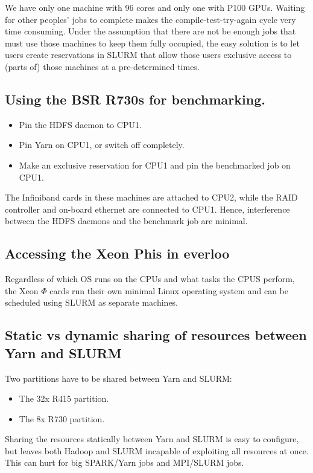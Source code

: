 \documentclass{article}
\begin{document}
We have only one machine with 96 cores and only one with P100 GPUs.
Waiting for other peoples' jobs to complete makes the compile-test-try-again
cycle very time consuming. Under the assumption that there are not be enough
jobs that must use those machines to keep them fully occupied, the easy solution
is to let users create reservations in SLURM that allow those users exclusive
access to (parts of) those machines at a pre-determined times.


\subsection{Using the BSR R730s for benchmarking.}

\begin{itemize}
\item Pin the HDFS daemon to CPU1.
\item Pin Yarn on CPU1, or switch off completely.
\item Make an exclusive reservation for CPU1 and pin the benchmarked job
on CPU1.
\end{itemize}

The Infiniband cards in these machines are attached to CPU2, while the
RAID controller and on-board ethernet are connected to CPU1. Hence,
interference between the HDFS daemons and the benchmark job are minimal.


\subsection{Accessing the Xeon Phis in everloo}

Regardless of which OS runs on the CPUs and what tasks the CPUS perform, the Xeon $\Phi$ cards
run their own minimal Linux operating system and can be scheduled using SLURM as separate machines.

\subsection{Static vs dynamic sharing of resources between Yarn and SLURM}

Two partitions have to be shared between Yarn and SLURM:
\begin{itemize}
\item The 32x R415 partition.
\item The 8x R730 partition.
\end{itemize}

Sharing the resources statically between Yarn and SLURM is easy to configure,
but leaves both Hadoop and SLURM incapable of exploiting all resources at once.
This can hurt for big SPARK/Yarn jobs and MPI/SLURM jobs.
\end{document}
